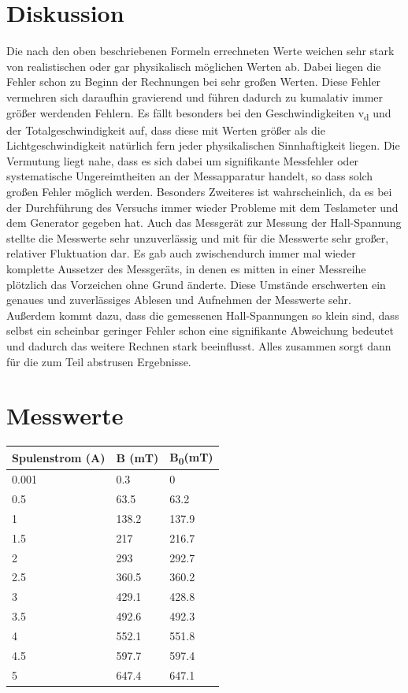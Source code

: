 \documentclass[titlepage=firstcover, captions=tableheading]{scrartcl}
\begin{document}
\section{Diskussion}
Die nach den oben beschriebenen Formeln errechneten Werte weichen sehr stark von realistischen oder gar physikalisch möglichen Werten ab. Dabei liegen die Fehler schon zu Beginn der Rechnungen bei sehr großen Werten. Diese Fehler vermehren sich daraufhin gravierend und führen dadurch zu kumalativ immer größer werdenden Fehlern. Es fällt besonders bei den Geschwindigkeiten v\textsubscript{d} und der Totalgeschwindigkeit auf, dass diese mit Werten größer als die Lichtgeschwindigkeit natürlich fern jeder physikalischen Sinnhaftigkeit liegen. Die Vermutung liegt nahe, dass es sich dabei um signifikante Messfehler oder systematische Ungereimtheiten an der Messapparatur handelt, so dass solch großen Fehler möglich werden. Besonders Zweiteres ist wahrscheinlich, da es bei der Durchführung des Versuchs immer wieder Probleme mit dem Teslameter und dem Generator gegeben hat. Auch das Messgerät zur Messung der Hall-Spannung stellte die Messwerte sehr unzuverlässig und mit für die Messwerte sehr großer, relativer Fluktuation dar. Es gab auch zwischendurch immer mal wieder komplette Aussetzer des Messgeräts, in denen es mitten in einer Messreihe plötzlich das Vorzeichen ohne Grund änderte. Diese Umstände erschwerten ein genaues und zuverlässiges Ablesen und Aufnehmen der Messwerte sehr. Außerdem kommt dazu, dass die gemessenen Hall-Spannungen so klein sind, dass selbst ein scheinbar geringer Fehler schon eine signifikante Abweichung bedeutet und dadurch das weitere Rechnen stark beeinflusst. Alles zusammen sorgt dann für die zum Teil abstrusen Ergebnisse.

\section{Messwerte}
\begin{center}
    \begin{tabular}{lll}
        \toprule
        Spulenstrom (A) & B (mT) & B\textsubscript{0}(mT) \\
        \midrule 
        0.001     &      0.3  &   0\\
        0.5       &      63.5 &   63.2 \\
        1         &      138.2&   137.9\\
        1.5       &      217  &   216.7\\
        2         &      293  &   292.7\\
        2.5       &      360.5&   360.2\\
        3         &      429.1&   428.8\\
        3.5       &      492.6&   492.3\\
        4         &      552.1&   551.8\\
        4.5       &      597.7&   597.4\\
        5         &      647.4&   647.1\\
        \bottomrule
    \end{tabular}
\end{center}
\end{document}
